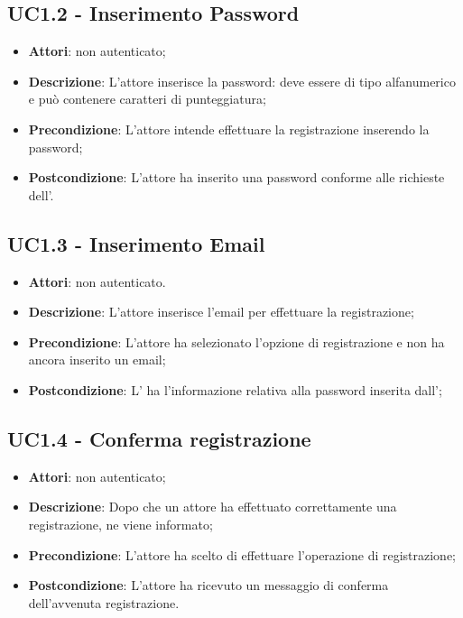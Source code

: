 \subsection{UC1.2 - Inserimento Password}
\label{ssec:UC1.2}
\begin{itemize}
\item \textbf{Attori}:  non autenticato;
\item \textbf{Descrizione}: L’attore inserisce la password: deve essere di tipo alfanumerico e può contenere caratteri di punteggiatura;
\item \textbf{Precondizione}: L'attore intende effettuare la registrazione inserendo la password;
\item \textbf{Postcondizione}: L'attore ha inserito una password conforme alle richieste dell'.
\end{itemize}
\subsection{UC1.3 - Inserimento Email}
\label{ssec:UC1.3}
\begin{itemize}
\item \textbf{Attori}:  non autenticato.
\item \textbf{Descrizione}: L’attore inserisce l'email per effettuare la registrazione;
\item \textbf{Precondizione}: L'attore ha selezionato l'opzione di registrazione e non ha ancora inserito un email;
\item \textbf{Postcondizione}: L' ha l’informazione relativa alla password inserita dall’;
\end{itemize}
\newpage
\subsection{UC1.4 - Conferma registrazione}
\label{ssec:UC1.4}
\begin{itemize}
\item \textbf{Attori}:  non autenticato;
\item \textbf{Descrizione}: Dopo che un attore ha effettuato correttamente una registrazione, ne viene informato;
\item \textbf{Precondizione}: L'attore ha scelto di effettuare l'operazione di registrazione;
\item \textbf{Postcondizione}: L'attore ha ricevuto un messaggio di conferma dell'avvenuta registrazione.
\end{itemize}

